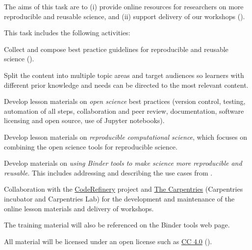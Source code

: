 \begin{task}[
  title=Best practice guidelines for reproducible science,
  id=online-resources,
  lead=UIO,
  PM=13,
  partners={SRL,MP,IFR}
]
The aims of this task are to (i) provide online resources for researchers on more reproducible
and reusable science, and (ii) support delivery of our workshops
().

This task includes the following activities:
  \begin{compactitem}
  \item Collect and compose best practice guidelines for reproducible and
    reusable science ().
  \item Split the content into multiple topic areas and target audiences so learners
    with different prior knowledge and needs can be directed to the most relevant content.
  \item Develop lesson materials on \emph{open science} best practices (version
    control, testing, automation of all steps, collaboration and peer review,
    documentation, software licensing and open source, use of Jupyter
    notebooks).
  \item Develop lesson materials on \emph{reproducible computational science},
    which focuses on combining the open science tools for reproducible science.
  \item Develop materials on \emph{using Binder tools to make science more
      reproducible and reusable}. This includes addressing and describing the
    use cases from .
  \item Collaboration with the \href{https://coderefinery.org}{CodeRefinery}
    project and \href{https://carpentries.org/}{The Carpentries} (Carpentries incubator and Carpentries Lab)
    for the development and maintenance of the online lesson materials and delivery of workshops.
  \item The training material will also be referenced on the Binder tools web page.
  \end{compactitem}
  All material will be licensed under an open license such as
  \href{https://creativecommons.org/licenses/by/4.0/}{CC 4.0}
  ().
\end{task}
